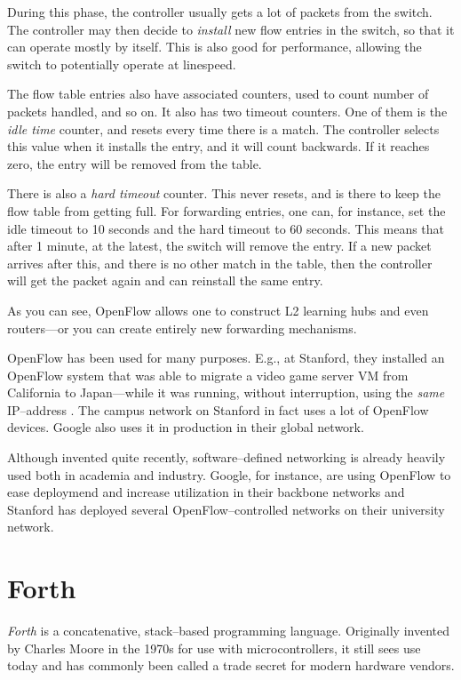 During this phase, the controller usually gets a lot of packets from the
switch.  The controller may then decide to \textit{install} new flow entries
in the switch, so that it can operate mostly by itself.  This is also good
for performance, allowing the switch to potentially operate at linespeed.

The flow table entries also have associated counters, used to count number
of packets handled, and so on.  It also has two timeout counters.  One of
them is the \textit{idle time} counter, and resets every time there is a
match.  The controller selects this value when it installs the entry, and it
will count backwards.  If it reaches zero, the entry will be removed from
the table.

There is also a \textit{hard timeout} counter.  This never resets, and is
there to keep the flow table from getting full.  For forwarding entries, one
can, for instance, set the idle timeout to 10 seconds and the hard timeout
to 60 seconds.  This means that after 1 minute, at the latest, the switch
will remove the entry.  If a new packet arrives after this, and there is no
other match in the table, then the controller will get the packet again and
can reinstall the same entry.

As you can see, OpenFlow allows one to construct L2 learning hubs and even
routers---or you can create entirely new forwarding mechanisms.

OpenFlow has been used for many purposes.  E.g., at Stanford, they installed
an OpenFlow system that was able to migrate a video game server \ac{VM} from
California to Japan---while it was running, without interruption, using the
\textit{same} IP--address \cite{erickson2008demonstration}
\cite{kobayashi2013maturing}.
The campus network on Stanford in fact uses a lot of OpenFlow devices.
Google also uses it in production in their global network.

Although invented quite recently, software--defined networking is already
heavily used both in academia and industry.  Google, for instance, are using
OpenFlow to ease deploymend and increase utilization in their backbone
networks \cite{crabbe2012sdn} and Stanford has deployed several
OpenFlow--controlled networks on their university network.

\section{Forth}
\label{chapter:background.forth}

\textit{Forth} is a concatenative, stack--based programming language.
Originally invented by Charles Moore in the 1970s for use with
microcontrollers, it still sees use today and has commonly been called a
trade secret for modern hardware vendors.

